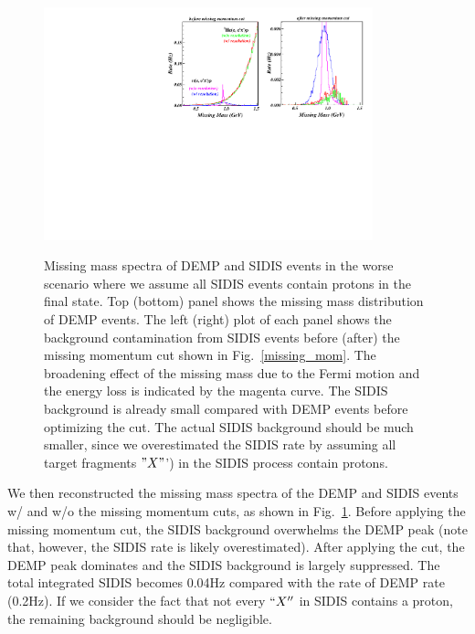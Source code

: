 \begin{figure}[!ht]
 \begin{center}
      \includegraphics[type=pdf,
        ext=.pdf,read=.pdf,width=0.85\textwidth]
{./figures/Missing_Mass_Fermi_Rad_02Hz} \\
   \caption[Missing Mass]{\footnotesize{Missing mass spectra of DEMP and SIDIS
events in the worse scenario where we assume all SIDIS events contain protons in the final state. 
Top (bottom) panel shows the missing mass distribution of DEMP events.
The left (right) plot of each panel shows the background contamination from
SIDIS events before (after) the missing momentum cut shown in
Fig.~\ref{missing_mom}. The broadening effect of the missing mass due to the
Fermi motion and the energy loss is indicated by the magenta curve. The SIDIS
background is already small compared with DEMP events before optimizing the
cut. The actual SIDIS background should be much smaller, since we overestimated
the SIDIS rate by assuming all target fragments $"X"$') in the SIDIS process
contain protons.}}
  \label{missing_mass}
  \end{center}
\end{figure}

We then reconstructed the missing mass spectra of the DEMP and SIDIS events w/
and w/o the missing momentum cuts, as shown in Fig.~\ref{missing_mass}. Before
applying the missing momentum cut, the SIDIS background overwhelms the DEMP
peak (note that, however, the SIDIS rate is likely overestimated). After
applying the cut, the DEMP peak dominates and the SIDIS background is largely
suppressed. The total integrated SIDIS becomes 0.04Hz compared with the rate of DEMP rate (0.2Hz).
 If we consider the fact that not every $``X''$ in SIDIS contains a
proton, the remaining background should be negligible.

